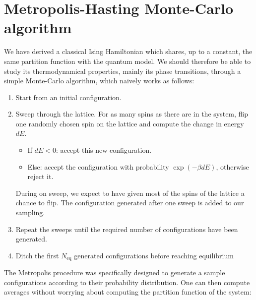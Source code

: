 \documentclass[11pt,openany]{article}
\begin{document}
\section{Metropolis-Hasting Monte-Carlo algorithm}

We have derived a classical Ising Hamiltonian which shares, up to a constant, the same partition function with the quantum model. We should therefore be able to study its thermodynamical properties, mainly its phase transitions, through a simple Monte-Carlo algorithm, which naively works as follows:

\begin{tcolorbox}[title=Metropolis-Hasting algorithm]
	
	\begin{enumerate}
		
		\item Start from an initial configuration.
		
		\item Sweep through the lattice. For as many spins as there are in the system, flip one randomly chosen spin on the lattice and compute the change in energy $dE$.
			\begin{itemize}
				\item If $dE<0$: accept this new configuration.
				
				\item Else: accept the configuration with probability $\exp\left(-\beta dE\right)$, otherwise reject it.
			\end{itemize}
		
		During on sweep, we expect to have given most of the spins of the lattice a chance to flip. The configuration generated after one sweep is added to our sampling.
		
		\item Repeat the sweeps until the required number of configurations have been generated.
		
		\item Ditch the first $N_\mathrm{eq}$ generated configurations before reaching equilibrium
		
	\end{enumerate}
	
\end{tcolorbox}

The Metropolis procedure was specifically designed to generate a sample configurations according to their probability distribution. One can then compute averages without worrying about computing the partition function of the system:
\end{document}
